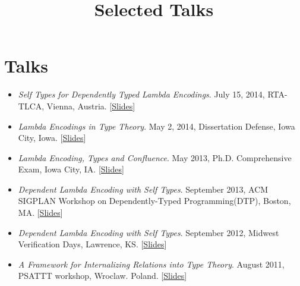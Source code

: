 \documentclass[10pt]{article}
\title{\bfseries\Large Selected Talks}
\date{}
\begin{document}
\maketitle
\vspace{-4em}

\vspace{20pt}
\section*{Talks}
\begin{itemize}
\item \textit{Self Types for Dependently Typed Lambda Encodings}. July 15, 2014, RTA-TLCA, Vienna, Austria. [\href{../../document/talks/rta-tlca-14.pdf}{Slides}]
\item \textit{Lambda Encodings in Type Theory}. May 2, 2014, Dissertation Defense, Iowa City, Iowa. [\href{../../document/talks/thesis-talk.pdf}{Slides}]
\item \textit{Lambda Encoding, Types and Confluence}. May 2013, Ph.D. Comprehensive Exam, Iowa City, IA. [\href{../../document/talks/comp.pdf}{Slides}]
\item \textit{Dependent Lambda Encoding with Self Types}. September 2013, ACM SIGPLAN Workshop on Dependently-Typed Programming(DTP), Boston, MA. [\href{../../document/talks/dtp-2013.pdf}{Slides}]
\item \textit{Dependent Lambda Encoding with Self Types}. September 2012, Midwest Verification Days, Lawrence, KS. [\href{../../document/talks/mvd-2012.pdf}{Slides}]

\item \textit{A Framework for Internalizing Relations into Type Theory}. August 2011, PSATTT workshop, Wroclaw. Poland. [\href{../../document/talks/psattt11-talk.pdf}{Slides}]
\end{itemize}
\end{document}
